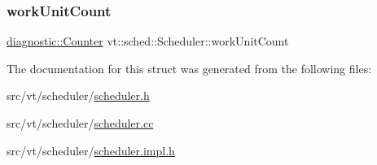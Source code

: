 \mbox{\label{structvt_1_1sched_1_1_scheduler_a1b22d8a8efd0cb27fdba01ae616e060b}} 
\subsubsection{\texorpdfstring{work\+Unit\+Count}{workUnitCount}}
{\footnotesize\ttfamily \hyperlink{namespacevt_1_1diagnostic_a55fcc9d6ffa285d1b085c01df2507d2f}{diagnostic\+::\+Counter} vt\+::sched\+::\+Scheduler\+::work\+Unit\+Count\hspace{0.3cm}{\ttfamily [private]}}



The documentation for this struct was generated from the following files\+:\begin{DoxyCompactItemize}
\item 
src/vt/scheduler/\hyperlink{scheduler_8h}{scheduler.\+h}\item 
src/vt/scheduler/\hyperlink{scheduler_8cc}{scheduler.\+cc}\item 
src/vt/scheduler/\hyperlink{scheduler_8impl_8h}{scheduler.\+impl.\+h}\end{DoxyCompactItemize}
